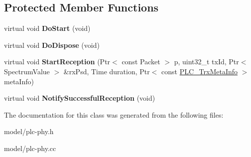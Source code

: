 \subsection*{\-Protected \-Member \-Functions}
\begin{DoxyCompactItemize}
\item 
\hypertarget{classns3_1_1PLC__ChaseCombiningPhy_a97c506d8c8d1aa3a0d5ad87c4b4390e0}{virtual void {\bfseries \-Do\-Start} (void)}\label{classns3_1_1PLC__ChaseCombiningPhy_a97c506d8c8d1aa3a0d5ad87c4b4390e0}

\item 
\hypertarget{classns3_1_1PLC__ChaseCombiningPhy_a63f2e7dc5bd8afa62741894b71ba5494}{virtual void {\bfseries \-Do\-Dispose} (void)}\label{classns3_1_1PLC__ChaseCombiningPhy_a63f2e7dc5bd8afa62741894b71ba5494}

\item 
\hypertarget{classns3_1_1PLC__ChaseCombiningPhy_ae411682ccc0a51fa2e99bf222f7a0132}{virtual void {\bfseries \-Start\-Reception} (\-Ptr$<$ const \-Packet $>$ p, uint32\-\_\-t tx\-Id, \-Ptr$<$ \-Spectrum\-Value $>$ \&rx\-Psd, \-Time duration, \-Ptr$<$ const \hyperlink{classns3_1_1PLC__TrxMetaInfo}{\-P\-L\-C\-\_\-\-Trx\-Meta\-Info} $>$ meta\-Info)}\label{classns3_1_1PLC__ChaseCombiningPhy_ae411682ccc0a51fa2e99bf222f7a0132}

\item 
\hypertarget{classns3_1_1PLC__ChaseCombiningPhy_ab6099530bb694ab9e6912fc5ff6fef2c}{virtual void {\bfseries \-Notify\-Successful\-Reception} (void)}\label{classns3_1_1PLC__ChaseCombiningPhy_ab6099530bb694ab9e6912fc5ff6fef2c}

\end{DoxyCompactItemize}


\-The documentation for this class was generated from the following files\-:\begin{DoxyCompactItemize}
\item 
model/plc-\/phy.\-h\item 
model/plc-\/phy.\-cc\end{DoxyCompactItemize}
